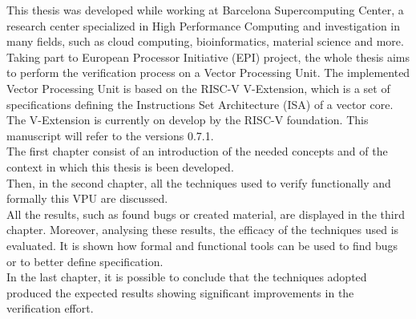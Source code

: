 \summary
\english

This thesis was developed while working at Barcelona Supercomputing Center, a research center specialized in High Performance Computing and investigation in many fields, such as cloud computing, bioinformatics, material science and more.\\


Taking part to European Processor Initiative (EPI) project, the whole thesis aims to perform the verification process on a Vector Processing Unit.
The implemented Vector Processing Unit is based on the RISC-V V-Extension, which is a set of specifications defining the Instructions Set Architecture (ISA) of a vector core. The V-Extension is currently on develop by the RISC-V foundation. This manuscript will refer to the versions 0.7.1.\\

The   first  chapter consist of an introduction of the needed concepts and of the context in which this thesis is been developed.\\

Then, in the second chapter, all the techniques used to verify functionally and formally this VPU are discussed.\\

All the results, such as found bugs or created material, are displayed in the third chapter. Moreover, analysing these results, the efficacy of the techniques used is evaluated. It is shown how formal and functional tools can be used to find bugs or to better define specification. \\

In the last chapter, it is possible to conclude that the techniques  adopted produced the expected results showing significant improvements in the verification effort.








\bigskip
